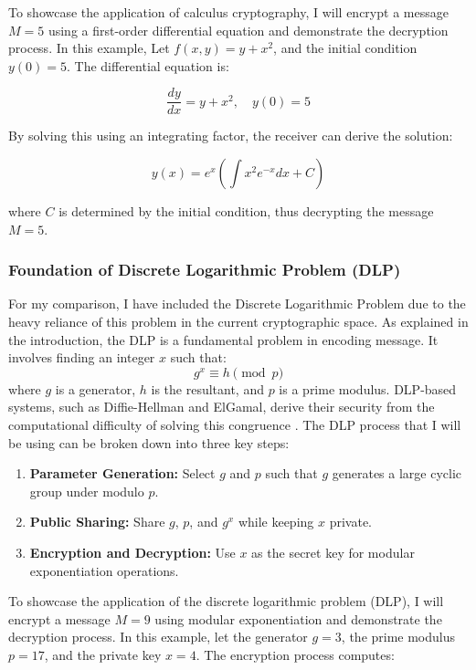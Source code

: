\documentclass[12pt]{article}
\begin{document}
To showcase the application of calculus cryptography, I will encrypt a message \( M = 5 \) using a first-order differential equation and demonstrate the decryption process. In this example, Let \( f(x, y) = y + x^2 \), and the initial condition \( y(0) = 5 \). The differential equation is:

\[
\frac{dy}{dx} = y + x^2, \quad y(0) = 5
\]

By solving this using an integrating factor, the receiver can derive the solution:

\[
y(x) = e^x \left(\int x^2 e^{-x} dx + C\right)
\]

where \( C \) is determined by the initial condition, thus decrypting the message \( M = 5 \).




\subsubsection*{Foundation of Discrete Logarithmic Problem (DLP)}

For my comparison, I have included the Discrete Logarithmic Problem due to the heavy reliance of this problem in the current cryptographic space. As explained in the introduction, the DLP is a fundamental problem in encoding message. It involves finding an integer \( x \) such that:
\[
g^x \equiv h \pmod{p}
\]
where \( g \) is a generator, \( h \) is the resultant, and \( p \) is a prime modulus. DLP-based systems, such as Diffie-Hellman and ElGamal, derive their security from the computational difficulty of solving this congruence \cite{HandbookAppliedCryptography}. The DLP process that I will be using can be broken down into three key steps:

\begin{enumerate}
    \item \textbf{Parameter Generation:} Select \( g \) and \( p \) such that \( g \) generates a large cyclic group under modulo \( p \).
    \item \textbf{Public Sharing:} Share \( g \), \( p \), and \( g^x \) while keeping \( x \) private.
    \item \textbf{Encryption and Decryption:} Use \( x \) as the secret key for modular exponentiation operations.
\end{enumerate}

To showcase the application of the discrete logarithmic problem (DLP), I will encrypt a message \( M = 9 \) using modular exponentiation and demonstrate the decryption process. In this example, let the generator \( g = 3 \), the prime modulus \( p = 17 \), and the private key \( x = 4 \). The encryption process computes:
\end{document}
